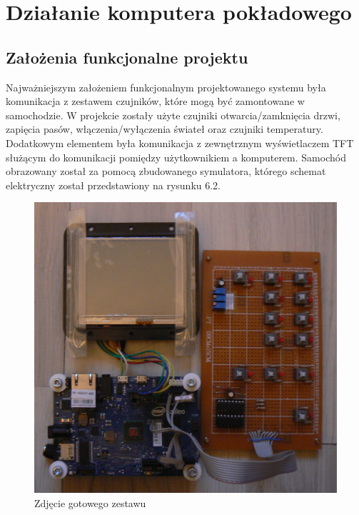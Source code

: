 \documentclass{xmgr}
\begin{document}

\chapter{Działanie komputera pokładowego}
\section{Założenia funkcjonalne projektu}
Najważniejszym założeniem funkcjonalnym projektowanego systemu była komunikacja z zestawem czujników, które mogą być zamontowane w samochodzie. W projekcie zostały użyte czujniki otwarcia/zamknięcia drzwi, zapięcia pasów, włączenia/wyłączenia świateł oraz czujniki temperatury. Dodatkowym elementem była komunikacja z zewnętrznym wyświetlaczem TFT służącym do komunikacji pomiędzy użytkownikiem a komputerem. Samochód obrazowany został za pomocą zbudowanego symulatora, którego schemat elektryczny został przedstawiony na rysunku 6.2.

\begin{figure}[!h]
    \centering
    	\includegraphics[height=0.35\textheight]{images/zestaw.jpg}
    \caption{Zdjęcie gotowego zestawu}
\end{figure}
\end{document}
